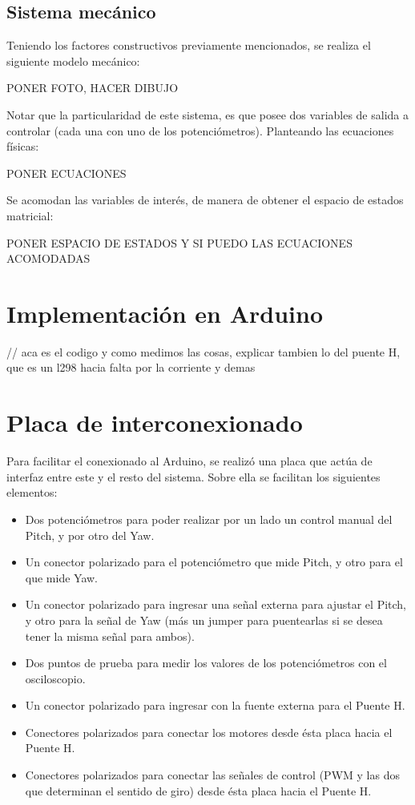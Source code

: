 \documentclass{article}
\begin{document}
\subsection{Sistema mecánico}
Teniendo los factores constructivos previamente mencionados, se realiza el siguiente modelo mecánico:

PONER FOTO, HACER DIBUJO

Notar que la particularidad de este sistema, es que posee dos variables de salida a controlar (cada una con uno de los potenciómetros). Planteando las ecuaciones físicas:

PONER ECUACIONES

Se acomodan las variables de interés, de manera de obtener el espacio de estados matricial:

PONER ESPACIO DE ESTADOS Y SI PUEDO LAS ECUACIONES ACOMODADAS 

\newpage

\section{Implementación en Arduino}
// aca es el codigo y como medimos las cosas, explicar tambien lo del puente H, que es un l298 hacia falta por la corriente y demas

\newpage

\section{Placa de interconexionado}

Para facilitar el conexionado al Arduino, se realizó una placa que actúa de interfaz entre este y el resto del sistema. Sobre ella se facilitan los siguientes elementos:

\begin{itemize}
\item Dos potenciómetros para poder realizar por un lado un control manual del Pitch, y por otro del Yaw.
\item Un conector polarizado para el potenciómetro que mide Pitch, y otro para el que mide Yaw.
\item Un conector polarizado para ingresar una señal externa para ajustar el Pitch, y otro para la señal de Yaw (más un jumper para puentearlas si se desea tener la misma señal para ambos).
\item Dos puntos de prueba para medir los valores de los potenciómetros con el osciloscopio.
\item Un conector polarizado para ingresar con la fuente externa para el Puente H.
\item Conectores polarizados para conectar los motores desde ésta placa hacia el Puente H.
\item Conectores polarizados para conectar las señales de control (PWM y las dos que determinan el sentido de giro) desde ésta placa hacia el Puente H.
\end{itemize}
\end{document}
